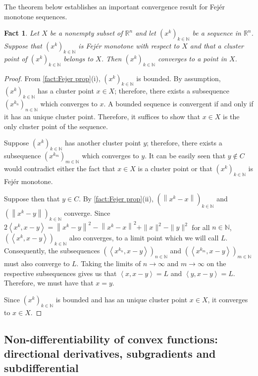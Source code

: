 \documentclass[smallextended,numbook,nospthms]{svjour3}
\theoremstyle{plain}
\newtheorem{fact}[theorem]{Fact}
\theoremstyle{definition}
\def\RR{\mathds R}
\def\NN{\mathds N}
\newcommand{\scal}[2]{\left\langle{#1},{#2}  \right\rangle}
\begin{document}
The theorem below establishes an important convergence result for Fejér monotone sequences.
\begin{fact}\label{fact:Fejer conv thm} Let $X$ be a nonempty subset of $\RR^{n}$ and let $\left(x^{k}\right)_{k \in \NN}$ be a sequence in $\RR^{n}$. Suppose that $\left(x^{k}\right)_{k \in \NN}$ is Fejér monotone with respect to $X$ and that a cluster point of $\left(x^{k}\right)_{k \in \NN}$ belongs to $X$. Then $\left(x^{k}\right)_{k \in \NN }$ converges to a point in $X$.
\end{fact}
\begin{proof}

From \cref{fact:Fejer prop}(i), $\left(x^{k}\right)_{k \in \NN}$ is bounded. By assumption, $\left(x^{k}\right)_{k \in \NN}$ has a cluster point $x \in X$; therefore, there exists a subsequence $\left(x^{k_n}\right)_{n \in \NN}$ which converges to $x$. A bounded sequence is convergent if and only if it has an unique cluster point. Therefore, it suffices to show that $x \in X$ is the only cluster point of the sequence.

Suppose $\left(x^{k}\right)_{k \in \NN}$ has another cluster point $y$; therefore, there exists a subsequence $\left(x^{k_m}\right)_{m \in \NN}$ which converges to $y$. It can be easily seen that $y \not \in C$ would contradict either the fact that $x \in X$ is a cluster point or that $\left(x^{k}\right)_{k \in \NN}$ is Fejér monotone. 

Suppose then that $y \in C$. By \cref{fact:Fejer prop}(ii), $\left(\left\|x^{k}-x\right\|\right)_{k \in \NN}$ and $\left(\left\|x^{k}-y\right\|\right)_{k \in \NN}$ converge. Since  $2 \scal{x^{k}}{x-y}=\left\|x^{k}-y\right\|^{2}-\left\|x^{k}-x\right\|^{2}+\|x\|^{2}-\|y\|^{2}$ for all $n \in \NN$, $\left(\scal{x^{k}}{x-y}\right)_{k \in \NN}$ also converges, to a limit point which we will call $L$. Consequently, the subsequences  $\left(\scal{x^{k_n}}{x-y}\right)_{n \in \NN}$ and  $\left(\scal{x^{k_m}}{x-y}\right)_{m \in \NN}$ must also converge to $L$. Taking the limits of $n \rightarrow \infty$ and $m \rightarrow \infty$ on the respective subsequences gives us that $\scal{x}{x-y}=L$ and $\scal{y}{x-y}=L$. Therefore, we must have that $x=y$.

Since $\left(x^{k}\right)_{k \in \NN}$ is bounded and has an unique cluster point $x \in X$, it converges to $x \in X$.
\end{proof}

\subsection{Non-differentiability of convex functions: directional derivatives, subgradients and subdifferential}\label{subsec:nonconv}
\end{document}
